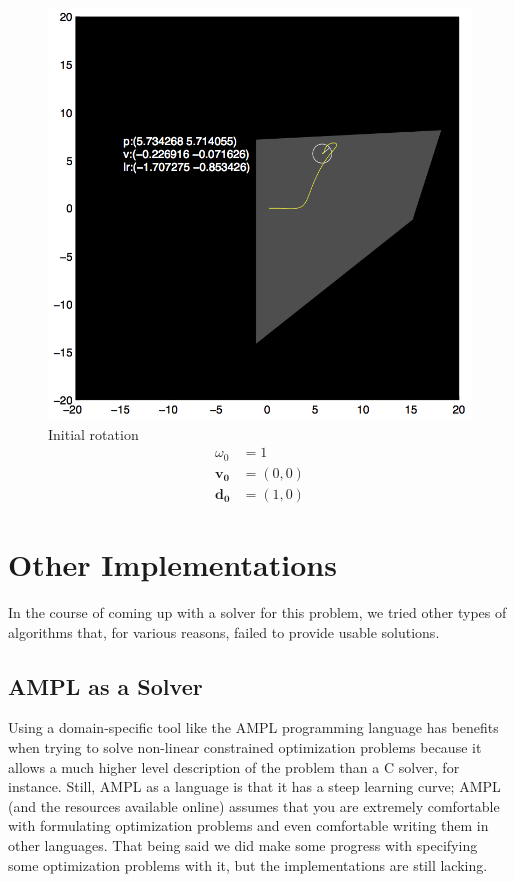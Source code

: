 \documentclass{report}
\begin{document}
\begin{figure}
\begin{minipage}{\linewidth}
\begin{minipage}[t]{0.45\linewidth}
    \includegraphics[width=\linewidth]{fig4.png}
    \captionsetup{singlelinecheck=off}
    \caption[.]{\label{fig:fig4}Initial rotation\begin{align*}
    \omega_0 &= 1 \\
    \mathbf{v_0} &= (0, 0)\\
    \mathbf{d_0} &= (1, 0)
    \end{align*}
    }
\end{minipage}
\end{minipage}
\end{figure}

\section{Other Implementations}
In the course of coming up with a solver for this problem, we tried other
types of algorithms that, for various reasons, failed to provide usable solutions.
\subsection{AMPL as a Solver}
Using a domain-specific tool like the AMPL programming language has benefits
when trying to solve non-linear constrained optimization problems because it
allows a much higher level description of the problem than a C solver, for instance.
Still, AMPL as a language is that it has a steep learning curve; AMPL (and the
resources available online) assumes that you are extremely comfortable with
formulating optimization
problems and even comfortable writing them in other languages. That being said
we did make some progress with specifying some optimization problems with it,
but the implementations are still lacking.
\end{document}
